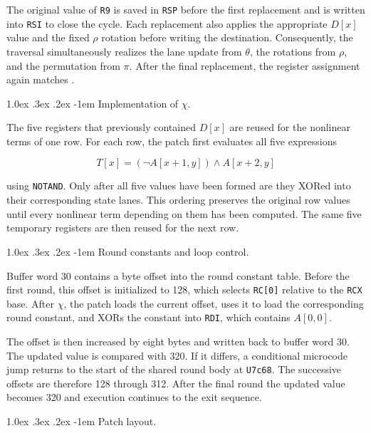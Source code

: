 \documentclass[journal=tches,submission]{iacrtrans}
\makeatletter
\newcommand{\code}[1]{\texttt{#1}}
\newcommand{\uop}[1]{\code{\textmu#1}}%
\renewcommand\paragraph{\@startsection{paragraph}{4}{\z@}%
      {1.0ex \@plus .3ex \@minus .2ex}%
      {-1em}%
      {\normalfont\normalsize\bfseries\SS@parafont}}
\makeatother
\begin{document}
The original value of \texttt{R9} is saved in \texttt{RSP} before the first replacement and is written into \texttt{RSI} to close the cycle.
Each replacement also applies the appropriate $D[x]$ value and the fixed $\rho$ rotation before writing the destination.
Consequently, the traversal simultaneously realizes the lane update from $\theta$, the rotations from $\rho$, and the permutation from $\pi$.
After the final replacement, the register assignment again matches .

\paragraph{Implementation of $\chi$.}

The five registers that previously contained $D[x]$ are reused for the nonlinear terms of one row.
For each row, the patch first evaluates all five expressions

$$
T[x] = (\lnot A[x+1,y]) \land A[x+2,y]
$$

using \uop{NOTAND}.
Only after all five values have been formed are they XORed into their corresponding state lanes.
This ordering preserves the original row values until every nonlinear term depending on them has been computed.
The same five temporary registers are then reused for the next row.

\paragraph{Round constants and loop control.}

Buffer word 30 contains a byte offset into the round constant table.
Before the first round, this offset is initialized to 128, which selects \texttt{RC[0]} relative to the \texttt{RCX} base.
After $\chi$, the patch loads the current offset, uses it to load the corresponding round constant, and XORs the constant into \texttt{RDI}, which contains $A[0,0]$.

The offset is then increased by eight bytes and written back to buffer word 30.
The updated value is compared with 320.
If it differs, a conditional microcode jump returns to the start of the shared round body at \texttt{U7c68}.
The successive offsets are therefore 128 through 312.
After the final round the updated value becomes 320 and execution continues to the exit sequence.

\paragraph{Patch layout.}
\end{document}
